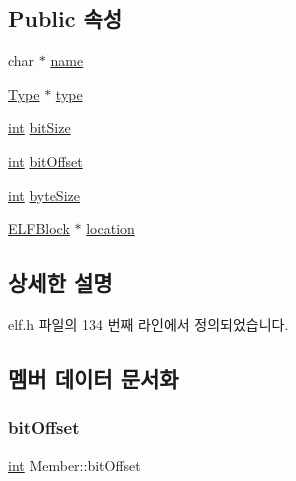 \subsection*{Public 속성}
\begin{DoxyCompactItemize}
\item 
char $\ast$ \mbox{\hyperlink{struct_member_ac8be1720085e46e70c678c5885837ccb}{name}}
\item 
\mbox{\hyperlink{struct_type}{Type}} $\ast$ \mbox{\hyperlink{struct_member_a7161459617d2ec472eb3830235c18d32}{type}}
\item 
\mbox{\hyperlink{_util_8cpp_a0ef32aa8672df19503a49fab2d0c8071}{int}} \mbox{\hyperlink{struct_member_a8bf551a2d4b44b5f83737444c90e15aa}{bit\+Size}}
\item 
\mbox{\hyperlink{_util_8cpp_a0ef32aa8672df19503a49fab2d0c8071}{int}} \mbox{\hyperlink{struct_member_a7c79fe4b6825fbbb5135651ddfb9ae8f}{bit\+Offset}}
\item 
\mbox{\hyperlink{_util_8cpp_a0ef32aa8672df19503a49fab2d0c8071}{int}} \mbox{\hyperlink{struct_member_a4c713b726b98ec770e1139b672899ef4}{byte\+Size}}
\item 
\mbox{\hyperlink{struct_e_l_f_block}{E\+L\+F\+Block}} $\ast$ \mbox{\hyperlink{struct_member_adceaf807e8862e3464a63dacfd1d7fb3}{location}}
\end{DoxyCompactItemize}


\subsection{상세한 설명}


elf.\+h 파일의 134 번째 라인에서 정의되었습니다.



\subsection{멤버 데이터 문서화}
\mbox{\label{struct_member_a7c79fe4b6825fbbb5135651ddfb9ae8f}} 
\subsubsection{\texorpdfstring{bit\+Offset}{bitOffset}}
{\footnotesize\ttfamily \mbox{\hyperlink{_util_8cpp_a0ef32aa8672df19503a49fab2d0c8071}{int}} Member\+::bit\+Offset}



